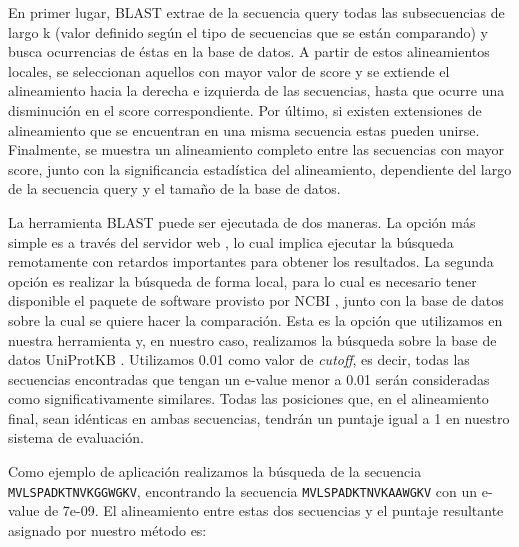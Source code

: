 En primer lugar, BLAST extrae de la secuencia query todas las subsecuencias de largo k (valor definido según el tipo de secuencias que se están comparando) y busca ocurrencias de éstas en la base de datos.
A partir de estos alineamientos locales, se seleccionan aquellos con mayor valor de score y se extiende el alineamiento hacia la derecha e izquierda de las secuencias, 
hasta que ocurre una disminución en el score correspondiente.
Por último, si existen extensiones de alineamiento que se encuentran en una misma secuencia estas pueden unirse.
Finalmente, se muestra un alineamiento completo entre las secuencias con mayor score, junto con 
la significancia estadística del alineamiento, dependiente del largo de la secuencia query y el tamaño de la base de datos.




La herramienta BLAST puede ser ejecutada de dos maneras. La opción más simple es a través del servidor web \cite{blastWeb}, lo cual implica ejecutar la búsqueda remotamente con retardos importantes para obtener los resultados. 
La segunda opción es realizar la búsqueda de forma local, para lo cual es necesario tener disponible el paquete de software provisto por NCBI \cite{blastLocal}, junto con la base de datos sobre la cual se quiere hacer la comparación.
Esta es la opción que utilizamos en nuestra herramienta y, en nuestro caso, realizamos la búsqueda sobre la base de datos UniProtKB \cite{bairoch2000swiss}.
Utilizamos 0.01 como valor de \textit{cutoff}, es decir, todas las secuencias encontradas que tengan un e-value menor a 0.01 serán consideradas como significativamente similares.
Todas las posiciones que, en el alineamiento final, sean idénticas en ambas secuencias, tendrán un puntaje igual a 1 en nuestro sistema de evaluación.

Como ejemplo de aplicación realizamos la búsqueda de la secuencia \\ \texttt{MVLSPADKTNVKGGWGKV}, encontrando la secuencia \mbox{\texttt{MVLSPADKTNVKAAWGKV}} con un e-value de 7e-09. 
El alineamiento entre estas dos secuencias y el puntaje resultante asignado por nuestro método es:
\vspace{0.5cm}

